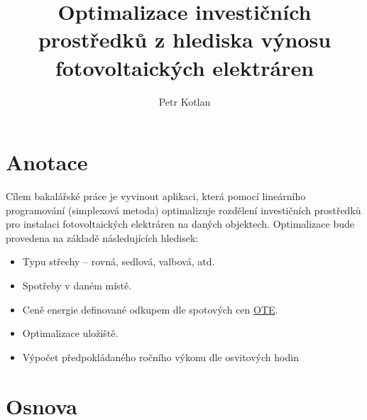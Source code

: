\documentclass[12pt, aspectratio=169]{beamer} %
\title[Optimalizace FVE]{Optimalizace investičních prostředků z hlediska výnosu fotovoltaických elektráren}
\author[Kotlan]{Petr Kotlan}
\institute[Přf UJEP]{Přírodovědecká fakulta\\ Univerzita J. E. Purkyně}
\date{}
\begin{document}
\begin{frame}[plain]

    \maketitle
    
\end{frame}

\section{Anotace}

\begin{frame}{\insertsection}
    Cílem bakalářské práce je vyvinout aplikaci, která pomocí lineárního programování (simplexová metoda)
    optimalizuje rozdělení investičních prostředků pro instalaci fotovoltaických elektráren na daných objektech.
    Optimalizace bude provedena na základě následujících hledisek:
    \begin{itemize}

        \item Typu střechy – rovná, sedlová, valbová, atd.
        \item Spotřeby v daném místě.
        \item Ceně energie definované odkupem dle spotových cen \href{https://www.ote-cr.cz/cs/kratkodobe-trhy/elektrina/vnitrodenni-trh?date=2023-12-01}{OTE}.
        \item Optimalizace uložiště.
        \item Výpočet předpokládaného ročního výkonu dle osvitových hodin
    
    \end{itemize}
\end{frame}

\section{Osnova}
\end{document}
